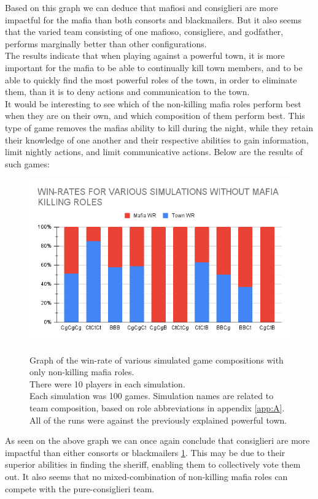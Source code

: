 \vspace{-5px}Based on this graph we can deduce that mafiosi and
consiglieri are more
impactful for the mafia than both consorts and blackmailers. But it also seems
that the varied team consisting of one mafioso, consigliere, and godfather,
performs marginally better than other configurations. \\
The results indicate that when playing against a powerful town, it is more
important for the mafia to be able to continually kill town members, and to be
able to quickly find the most powerful roles of the town, in order to eliminate
them, than it is to deny actions and communication to the town. \\
It would be interesting to see which of the non-killing mafia roles perform
best when they are on their own, and which composition of them perform best.
This type of game removes the mafias ability to kill during the night, while
they retain their knowledge of one another and their respective abilities to
gain information, limit nightly actions, and limit communicative actions. Below
are the results of such games:
\begin{figure}[H]
    \includegraphics[width=1\linewidth]{figures/Winrates_NonKilling}
    \caption{\\Graph of the win-rate of various simulated game compositions
        with only non-killing mafia roles.\\
        There were 10 players in each simulation.\\
        Each simulation was 100 games.
        Simulation names are related to team composition, based on role
        abbreviations in appendix \ref{app:A}.\\
        All of the runs were against the previously explained powerful town.}
    \label{fig:VariousSimulationsNonKilling}
\end{figure}
\vspace{-5px} As seen on the above graph we can once again conclude that
consiglieri are more impactful than either consorts or blackmailers \ref{fig:VariousSimulationsNonKilling}. This may
be due to their superior abilities in finding the sheriff, enabling them to
collectively vote them out. It also seems that no mixed-combination of
non-killing mafia roles can compete with the pure-consiglieri team.
